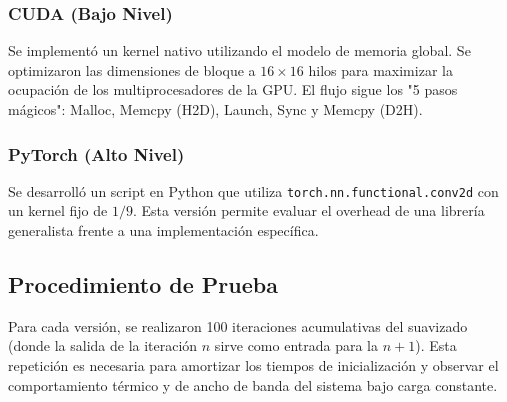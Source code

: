 \subsubsection{CUDA (Bajo Nivel)}
Se implementó un kernel nativo utilizando el modelo de memoria global. Se optimizaron las dimensiones de bloque a $16 \times 16$ hilos para maximizar la ocupación de los multiprocesadores de la GPU. El flujo sigue los "5 pasos mágicos": Malloc, Memcpy (H2D), Launch, Sync y Memcpy (D2H).

\subsubsection{PyTorch (Alto Nivel)}
Se desarrolló un script en Python que utiliza \texttt{torch.nn.functional.conv2d} con un kernel fijo de $1/9$. Esta versión permite evaluar el overhead de una librería generalista frente a una implementación específica.

\subsection{Procedimiento de Prueba}
Para cada versión, se realizaron 100 iteraciones acumulativas del suavizado (donde la salida de la iteración $n$ sirve como entrada para la $n+1$). Esta repetición es necesaria para amortizar los tiempos de inicialización y observar el comportamiento térmico y de ancho de banda del sistema bajo carga constante.

\FloatBarrier

\FloatBarrier